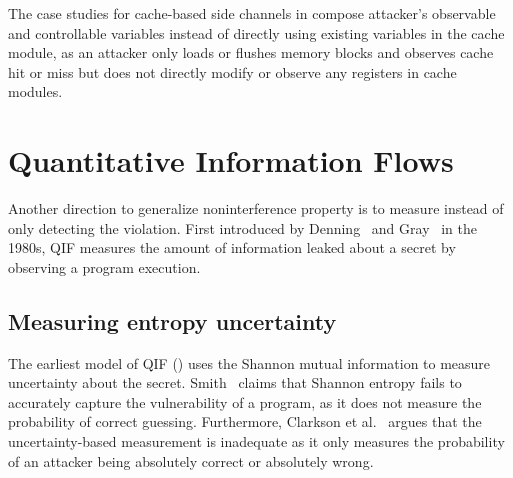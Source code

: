 The case studies for cache-based side channels in
 compose attacker's observable and controllable
variables instead of directly using existing variables in the cache
module, as an attacker only loads or flushes memory blocks and
observes cache hit or miss but does not directly modify or observe any
registers in cache modules. 
 
\section{Quantitative Information Flows}
\label{sec:related:qif}
Another direction to generalize noninterference property is to measure
instead of only detecting the violation. First introduced by
Denning~\cite{denning1982cryptography} and Gray~\cite{Gray:2991:TMF}
in the 1980s, \gls{QIF} measures the amount of information leaked
about a secret by observing a program execution. 
\subsection{Measuring entropy uncertainty} 
The earliest model of \gls{QIF}
(\cite{denning1982cryptography,Gray:2991:TMF, Clark:2002:QAL,
Clark:2005:QIF, Clark:2007:SAQ}) uses the Shannon mutual information
to measure uncertainty about the secret.
Smith~\cite{smith2009foundations} claims that Shannon entropy fails
to accurately capture the vulnerability of a program, as it does not
measure the probability of correct guessing. Furthermore, Clarkson et
al.~\cite{clarkson2005belief} argues that the uncertainty-based
measurement is inadequate as it only measures the probability of an
attacker being absolutely correct or absolutely wrong. 

